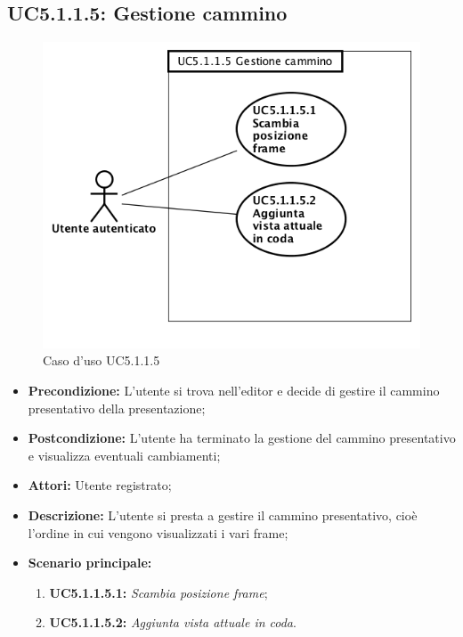 \newpage
\subsection{ UC5.1.1.5: Gestione cammino}

\begin{figure}[h]
	\begin{center}
	\includegraphics[scale=0.6]{diagram/UC5-1-1-5.png}
	\caption{Caso d'uso UC5.1.1.5}
	\end{center}
\end{figure}
\begin{itemize}
	\item \textbf{Precondizione:} L’utente si trova nell’editor e decide di gestire il cammino presentativo della presentazione;
	\item \textbf{Postcondizione:} L’utente ha terminato la gestione del cammino presentativo e visualizza eventuali cambiamenti;
	\item \textbf{Attori:} Utente registrato;
	\item \textbf{Descrizione:} L’utente si presta a gestire il cammino presentativo, cioè l’ordine in cui vengono visualizzati i vari frame;
	\item \textbf{Scenario principale:}
	\begin{enumerate}
		\item \textbf{ UC5.1.1.5.1:} \textit{ Scambia posizione frame};
		\item \textbf{ UC5.1.1.5.2:} \textit{ Aggiunta vista attuale in coda}.
	\end{enumerate}
\end{itemize}
